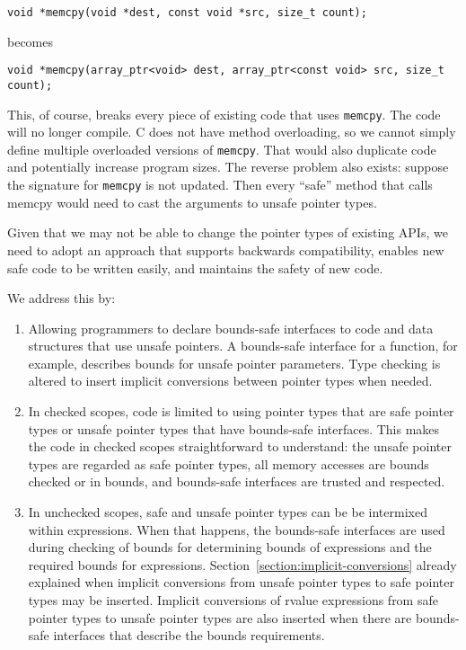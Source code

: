 \begin{verbatim}
void *memcpy(void *dest, const void *src, size_t count);
\end{verbatim}

becomes

\begin{verbatim}
void *memcpy(array_ptr<void> dest, array_ptr<const void> src, size_t count);
\end{verbatim}

This, of course, breaks every piece of existing code that uses \texttt{memcpy}.
The code will no longer compile. C does not have method overloading, so
we cannot simply define multiple overloaded versions of \texttt{memcpy}. That
would also duplicate code and potentially increase program sizes.
The reverse problem also exists: suppose the signature for \texttt{memcpy} is not
updated. Then every ``safe'' method that calls memcpy would need to cast
the arguments to unsafe pointer types.

Given that we may not be able to change the pointer types of existing
APIs, we need to adopt an approach that supports backwards
compatibility, enables new safe code to be written easily, and maintains
the safety of new code.

We address this by:

\begin{enumerate}
\item
  Allowing programmers to declare bounds-safe interfaces to code and
  data structures that use unsafe pointers. A bounds-safe interface for
  a function, for example, describes bounds for unsafe pointer
  parameters.   Type checking is altered to insert implicit conversions
  between pointer types when needed.
\item
  In checked scopes, code is limited to using pointer types that are 
  safe pointer types or unsafe pointer types that have bounds-safe interfaces.  
  This makes the code in checked scopes straightforward to understand:
  the unsafe pointer types are regarded as safe pointer types, all memory 
  accesses are bounds checked or in bounds, and bounds-safe interfaces are trusted
  and respected.
\item
  In unchecked scopes, safe and unsafe pointer types can be
  be intermixed within expressions.  When that happens, the bounds-safe
  interfaces are used during checking of bounds for determining bounds
  of expressions and the required bounds for expressions. 
  Section~\ref{section:implicit-conversions} already
  explained when implicit conversions from unsafe pointer types to safe pointer
  types may be inserted.   Implicit conversions of rvalue expressions 
  from safe pointer types to unsafe pointer types are also inserted when
  there are bounds-safe interfaces that describe the bounds requirements.
\end{enumerate}

